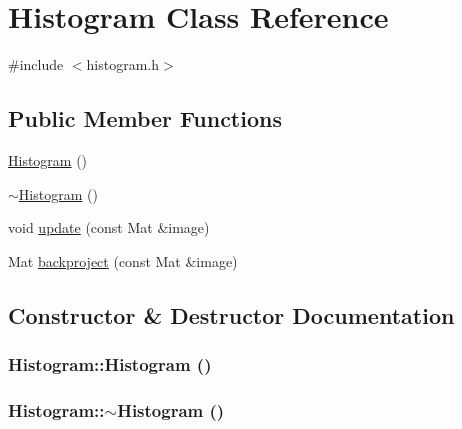 \hypertarget{class_histogram}{
\section{Histogram Class Reference}
\label{class_histogram}
}


{\ttfamily \#include $<$histogram.h$>$}

\subsection*{Public Member Functions}
\begin{DoxyCompactItemize}
\item 
\hyperlink{class_histogram_af681f293852ac145f867ecfcce3062a5}{Histogram} ()
\item 
\hyperlink{class_histogram_aaf22daf3b8e3f0578337109005532f51}{$\sim$Histogram} ()
\item 
void \hyperlink{class_histogram_a3fad34a25e6791d1b45a2daabb9ad2fe}{update} (const Mat \&image)
\item 
Mat \hyperlink{class_histogram_a9441aea95de9a366a15c0078ba12da74}{backproject} (const Mat \&image)
\end{DoxyCompactItemize}


\subsection{Constructor \& Destructor Documentation}
\hypertarget{class_histogram_af681f293852ac145f867ecfcce3062a5}{
\subsubsection[{Histogram}]{\setlength{\rightskip}{0pt plus 5cm}Histogram::Histogram ()}}
\label{class_histogram_af681f293852ac145f867ecfcce3062a5}
\hypertarget{class_histogram_aaf22daf3b8e3f0578337109005532f51}{
\subsubsection[{$\sim$Histogram}]{\setlength{\rightskip}{0pt plus 5cm}Histogram::$\sim$Histogram ()}}
\label{class_histogram_aaf22daf3b8e3f0578337109005532f51}


